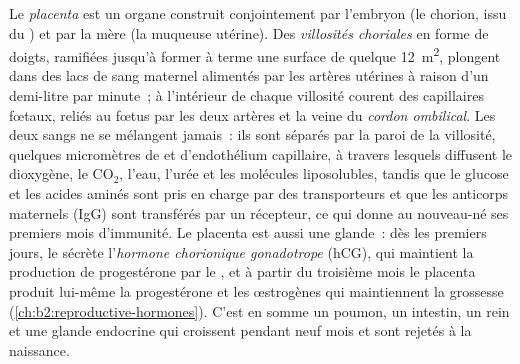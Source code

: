 \begin{definition}[Le placenta]\label{def:b2:mammal-reproduction:placenta}
Le \emph{placenta} est un organe construit conjointement par l'embryon
(le chorion, issu du ) et par la mère (la muqueuse
utérine). Des \emph{villosités choriales} en forme de doigts, ramifiées
jusqu'à former à terme une surface de quelque \qty{12}{m^2}, plongent
dans des lacs de sang maternel alimentés par les artères utérines à
raison d'un demi-litre par minute~; à l'intérieur de chaque villosité
courent des capillaires fœtaux, reliés au fœtus par les deux artères et
la veine du \emph{cordon ombilical}. Les deux sangs ne se mélangent
jamais~: ils sont séparés par la paroi de la villosité, quelques
micromètres de  et d'endothélium capillaire, à travers
lesquels diffusent le dioxygène, le $\mathrm{CO_2}$, l'eau, l'urée et
les molécules liposolubles, tandis que le glucose et les acides aminés
sont pris en charge par des transporteurs et que les anticorps
maternels (IgG) sont transférés par un récepteur, ce qui donne au
nouveau-né ses premiers mois d'immunité. Le placenta est aussi une
glande~: dès les premiers jours, le  sécrète
l'\emph{hormone chorionique gonadotrope} (hCG), qui maintient la
production de progestérone par le , et à partir du troisième
mois le placenta produit lui-même la progestérone et les œstrogènes qui
maintiennent la grossesse (\cref{ch:b2:reproductive-hormones}). C'est en
somme un poumon, un intestin, un rein et une glande endocrine qui
croissent pendant neuf mois et sont rejetés à la naissance.
\end{definition}

